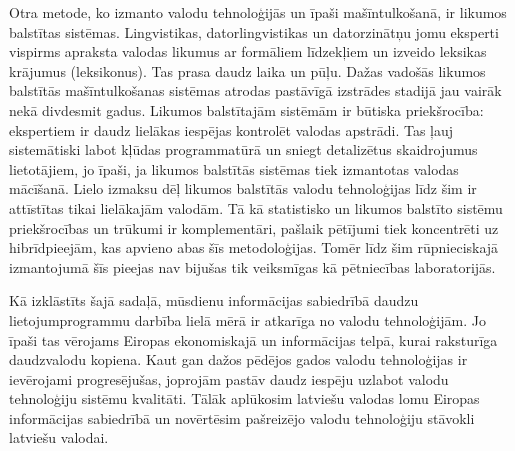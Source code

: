 \begin{multicols}{2}
Otra metode, ko izmanto valodu tehnoloģijās un īpaši mašīntulkošanā, ir likumos balstītas sistēmas. 
Lingvistikas, datorlingvistikas un datorzinātņu jomu eksperti vispirms apraksta valodas likumus ar formāliem līdzekļiem un izveido leksikas krājumus (leksikonus). 
Tas prasa daudz laika un pūļu.
Dažas vadošās likumos balstītās mašīntulkošanas sistēmas atrodas pastāvīgā izstrādes stadijā jau vairāk nekā divdesmit gadus. 
Likumos balstītajām sistēmām ir būtiska priekšrocība: ekspertiem ir daudz lielākas iespējas kontrolēt valodas apstrādi. 
Tas ļauj sistemātiski labot kļūdas programmatūrā un sniegt detalizētus skaidrojumus lietotājiem, jo īpaši, ja likumos balstītās sistēmas tiek izmantotas valodas mācīšanā.
Lielo izmaksu dēļ likumos balstītās valodu tehnoloģijas līdz šim ir attīstītas tikai lielākajām valodām. 
Tā kā statistisko un likumos balstīto sistēmu priekšrocības un trūkumi ir komplementāri, pašlaik pētījumi tiek koncentrēti uz hibrīdpieejām, kas apvieno abas šīs metodoloģijas. 
Tomēr līdz šim rūpnieciskajā izmantojumā šīs pieejas nav bijušas tik veiksmīgas kā pētniecības laboratorijās. 

Kā izklāstīts šajā sadaļā, mūsdienu informācijas sabiedrībā daudzu lietojumprogrammu darbība lielā mērā ir atkarīga no valodu tehnoloģijām. 
Jo īpaši tas vērojams Eiropas ekonomiskajā un informācijas telpā, kurai raksturīga daudzvalodu kopiena. 
Kaut gan dažos pēdējos gados valodu tehnoloģijas ir ievērojami progresējušas, joprojām pastāv daudz iespēju uzlabot valodu tehnoloģiju sistēmu kvalitāti. 
Tālāk aplūkosim latviešu valodas lomu Eiropas informācijas sabiedrībā un novērtēsim pašreizējo valodu tehnoloģiju stāvokli latviešu valodai. 

\end{multicols}

\clearpage



